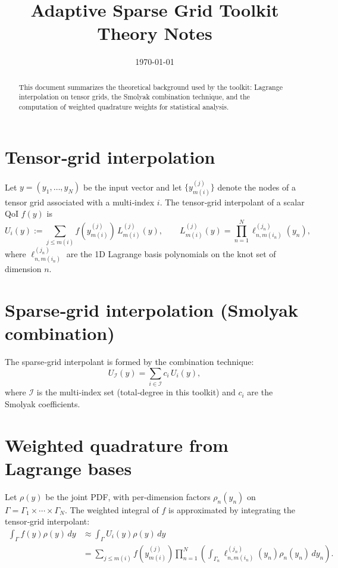 \documentclass[11pt,a4paper]{article}
\title{Adaptive Sparse Grid Toolkit\\Theory Notes}
\author{}
\date{\today}
\begin{document}
\maketitle

\begin{abstract}
This document summarizes the theoretical background used by the toolkit:
Lagrange interpolation on tensor grids, the Smolyak combination technique,
and the computation of weighted quadrature weights for statistical analysis.
\end{abstract}

\tableofcontents
\newpage

\section{Tensor‑grid interpolation}

Let $y = (y_1,\ldots,y_N)$ be the input vector and let
$\{y^{(j)}_{m(i)}\}$ denote the nodes of a tensor grid associated with a multi‑index $i$.
The tensor‑grid interpolant of a scalar QoI $f(y)$ is
\[
U_i(y) := \sum_{j \le m(i)} f\!\left(y^{(j)}_{m(i)}\right)\,L^{(j)}_{m(i)}(y),
\qquad
L^{(j)}_{m(i)}(y) = \prod_{n=1}^{N} \ell^{(j_n)}_{n,m(i_n)}(y_n),
\]
where $\ell^{(j_n)}_{n,m(i_n)}$ are the 1D Lagrange basis polynomials on the
knot set of dimension $n$.

\section{Sparse‑grid interpolation (Smolyak combination)}

The sparse‑grid interpolant is formed by the combination technique:
\[
U_{\mathcal{I}}(y) = \sum_{i \in \mathcal{I}} c_i\,U_i(y),
\]
where $\mathcal{I}$ is the multi‑index set (total‑degree in this toolkit)
and $c_i$ are the Smolyak coefficients.

\section{Weighted quadrature from Lagrange bases}

Let $\rho(y)$ be the joint PDF, with per‑dimension factors $\rho_n(y_n)$ on
$\Gamma = \Gamma_1 \times \cdots \times \Gamma_N$. The weighted integral of $f$ is
approximated by integrating the tensor‑grid interpolant:
\begin{align*}
\int_{\Gamma} f(y)\rho(y)\,dy
&\approx \int_{\Gamma} U_i(y)\rho(y)\,dy \\
&= \sum_{j \le m(i)} f\!\left(y^{(j)}_{m(i)}\right)
\prod_{n=1}^{N} \left(\int_{\Gamma_n} \ell^{(j_n)}_{n,m(i_n)}(y_n)\rho_n(y_n)\,dy_n\right).
\end{align*}
\end{document}
